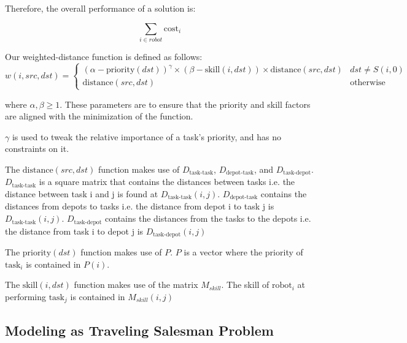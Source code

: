 \documentclass[a4paper]{article}
\begin{document}
Therefore, the overall performance of a solution is:

$$
\sum_{i \in \mathit{robot}} \text{cost}_i
$$

Our weighted-distance function is defined as follows:
$$
w(i, \mathit{src}, \mathit{dst}) = \begin{cases}
(\alpha - \text{priority}(\mathit{dst}))^\gamma \times (\beta - \text{skill}(i, \mathit{dst})) \times \text{distance}(\mathit{src}, \mathit{dst}) & \mathit{dst} \ne S(i,0) \\
\text{distance}(\mathit{src}, \mathit{dst}) & \text{otherwise}
\end{cases}
$$

where $\alpha, \beta \geq 1$. These parameters are to ensure that the priority and skill factors are aligned with the minimization of the function.

$\gamma$ is used to tweak the relative importance of a task's priority, and has no constraints on it.

The $\text{distance}(\mathit{src}, \mathit{dst})$ function makes use of $D_\text{task-task}$, $D_\text{depot-task}$, and $D_\text{task-depot}$. $D_\text{task-task}$ is a square matrix that contains the distances between tasks i.e. the distance between task i and j is found at $D_\text{task-task}(i,j)$. $D_\text{depot-task}$ contains the distances from depots to tasks i.e. the distance from depot i to task j is $D_\text{task-task}(i,j)$. $D_\text{task-depot}$ contains the distances from the tasks to the depots i.e. the distance from task i to depot j is $D_\text{task-depot}(i,j)$

The $\text{priority}(\mathit{dst})$ function makes use of $P$. $P$ is a vector where the priority of $\text{task}_i$ is contained in $P(i)$.

The $\text{skill}(i, \mathit{dst})$ function makes use of the matrix $M_{skill}$. The skill of $\text{robot}_i$ at performing $\text{task}_j$ is contained in $M_{skill}(i,j)$

\subsection{Modeling as Traveling Salesman Problem}

\end{document}
